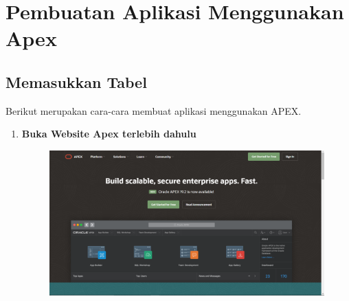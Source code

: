 \chapter*{Pembuatan Aplikasi Menggunakan Apex}
\section{Memasukkan Tabel}
\par
Berikut merupakan cara-cara membuat aplikasi menggunakan APEX.
\begin{enumerate}
\item \textbf{Buka Website Apex terlebih dahulu}
\begin{figure}[H]
    \centering
    \includegraphics[scale=0.3]{figures/1.png}
    \label{1}
\end{figure}


\end{enumerate}

